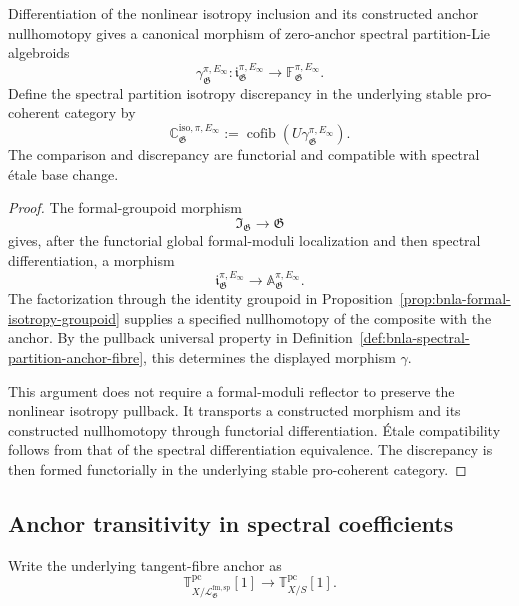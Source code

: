 \begin{theorem}
\label{thm:bnla-spectral-partition-isotropy-comparison}
Differentiation of the nonlinear isotropy inclusion and its constructed
anchor nullhomotopy gives a canonical morphism of zero-anchor spectral
partition-Lie algebroids
\[
\boxed{
    \gamma^{\pi,E_\infty}_{\mathfrak G}:
    \mathfrak i^{\pi,E_\infty}_{\mathfrak G}
    \longrightarrow
    \mathbb F^{\pi,E_\infty}_{\mathfrak G}.}
\]
Define the spectral partition isotropy discrepancy in the underlying stable
pro-coherent category by
\[
\boxed{
    \mathbb C^{\mathrm{iso},\pi,E_\infty}_{\mathfrak G}
    :=
    \operatorname{cofib}
    \left(
        U\gamma^{\pi,E_\infty}_{\mathfrak G}
    \right).}
\]
The comparison and discrepancy are functorial and compatible with spectral
étale base change.
\end{theorem}

\begin{proof}
The formal-groupoid morphism
\[
    \mathfrak I_{\mathfrak G}\longrightarrow\mathfrak G
\]
gives, after the functorial global formal-moduli localization and then
spectral differentiation, a morphism
\[
    \mathfrak i^{\pi,E_\infty}_{\mathfrak G}
    \longrightarrow
    \mathbb A^{\pi,E_\infty}_{\mathfrak G}.
\]
The factorization through the identity groupoid in
Proposition~\ref{prop:bnla-formal-isotropy-groupoid} supplies a specified
nullhomotopy of the composite with the anchor.  By the pullback universal
property in
Definition~\ref{def:bnla-spectral-partition-anchor-fibre}, this determines
the displayed morphism $\gamma$.

This argument does not require a formal-moduli reflector to preserve the
nonlinear isotropy pullback.  It transports a constructed morphism and its
constructed nullhomotopy through functorial differentiation.  Étale
compatibility follows from that of the spectral differentiation equivalence.
The discrepancy is then formed functorially in the underlying stable
pro-coherent category.
\end{proof}

\subsection{Anchor transitivity in spectral coefficients}

Write the underlying tangent-fibre anchor as
\[
    \mathbb T^{\mathrm{pc}}_{X/\mathcal L^{\mathrm{fm,sp}}_{\mathfrak G}}[1]
    \longrightarrow
    \mathbb T^{\mathrm{pc}}_{X/S}[1].
\]

